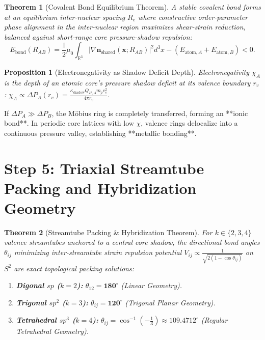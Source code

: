 \documentclass[11pt,a4paper]{article}
\newtheorem{prop}{Proposition}
\newtheorem{thm}{Theorem}
\begin{document}
	\begin{thm}[Covalent Bond Equilibrium Theorem]
		\label{thm:covalent_bond}
		A stable covalent bond forms at an equilibrium inter-nuclear spacing $R_e$ where constructive order-parameter phase alignment in the inter-nuclear region maximizes shear-strain reduction, balanced against short-range core pressure-shadow repulsion:
		\begin{equation}
			E_{\text{bond}}(R_{AB}) = \frac{1}{2}\mu_0 \int_{\mathbb{R}^3} \left| \nabla \mathbf{n}_{\text{shared}}(\mathbf{x}; R_{AB}) \right|^2 d^3x - \left( E_{\text{atom}, A} + E_{\text{atom}, B} \right) < 0.
		\end{equation}
	\end{thm}
	
	\begin{prop}[Electronegativity as Shadow Deficit Depth]
		\label{prop:electronegativity}
		Electronegativity $\chi_A$ is the depth of an atomic core's pressure shadow deficit at its valence boundary $r_v$: $\chi_A \propto \Delta P_A(r_v) = \frac{\kappa_{\text{shadow}} Q_{H, A} m_p c_s^2}{4\pi r_v}$.
	\end{prop}
	
	If $\Delta P_A \gg \Delta P_B$, the Möbius ring is completely transferred, forming an **ionic bond**. In periodic core lattices with low $\chi$, valence rings delocalize into a continuous pressure valley, establishing **metallic bonding**.
	
	\section{Step 5: Triaxial Streamtube Packing and Hybridization Geometry}
	\label{sec:step5_molecular_geometry}
	
	\begin{thm}[Streamtube Packing \& Hybridization Theorem]
		\label{thm:hybridization_angles}
		For $k \in \{2, 3, 4\}$ valence streamtubes anchored to a central core shadow, the directional bond angles $\theta_{ij}$ minimizing inter-streamtube strain repulsion potential $V_{ij} \propto \frac{1}{\sqrt{2(1-\cos\theta_{ij})}}$ on $S^2$ are exact topological packing solutions:
		\begin{enumerate}
			\item \textbf{Digonal $sp$ ($k=2$):} $\theta_{12} = \mathbf{180^\circ}$ (Linear Geometry).
			\item \textbf{Trigonal $sp^2$ ($k=3$):} $\theta_{ij} = \mathbf{120^\circ}$ (Trigonal Planar Geometry).
			\item \textbf{Tetrahedral $sp^3$ ($k=4$):} $\theta_{ij} = \cos^{-1}\left(-\frac{1}{3}\right) \approx \mathbf{109.4712^\circ}$ (Regular Tetrahedral Geometry).
		\end{enumerate}
	\end{thm}
	
\end{document}
